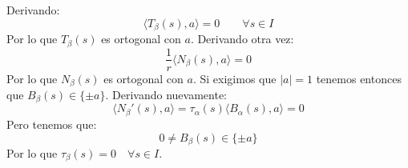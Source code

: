 \begin{ejercicio}
\begin{enumerate}
            Derivando:
            \begin{equation*}
                \langle T_\beta(s),a \rangle = 0 \qquad \forall s\in I
            \end{equation*}
            Por lo que $T_\beta(s)$ es ortogonal con $a$. Derivando otra vez:
            \begin{equation*}
                \frac{1}{r}\langle N_\beta(s),a \rangle = 0
            \end{equation*}
            Por lo que $N_\beta(s)$ es ortogonal con $a$. Si exigimos que $|a|=1$ tenemos entonces que $B_\beta(s) \in \{\pm a\}$. Derivando nuevamente:
            \begin{equation*}
                \langle N_\beta'(s),a \rangle = \tau_\alpha(s) \langle B_\alpha(s),a  \rangle  = 0
            \end{equation*}
            Pero tenemos que:
            \begin{equation*}
                0\neq B_\beta(s) \in \{\pm a\} 
            \end{equation*}
            Por lo que $\tau_\beta(s) = 0\quad \forall s\in I$.
    \end{enumerate}
\end{ejercicio}


